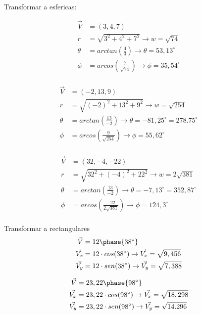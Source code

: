     Transformar a esfericas:

    \begin{align*}
        \vec{V}&=(3,4,7) \\
        r &= \sqrt{3^2+4^2+7^2} \rightarrow w =\sqrt{74}  \\
        \theta&= arctan\left(\frac{4}{3}\right)  \rightarrow \theta= 53,13^\circ \\
        \phi &=arcos\left(\frac{7}{\sqrt{74}}\right)  \rightarrow \phi= 35,54^\circ\\
    \end{align*}

    \begin{align*}
        \vec{V}&=(-2,13,9) \\
        r &= \sqrt{(-2)^2+13^2+9^2}  \rightarrow w =\sqrt{254}  \\
        \theta&= arctan\left(\frac{13}{-2}\right)  \rightarrow \theta= -81,25^\circ= 278.75^\circ\\
        \phi &= arcos\left(\frac{9}{\sqrt{254}}\right)  \rightarrow \phi=  55,62^\circ\\
    \end{align*}

    \begin{align*}
        \vec{V}&=(32,-4,-22) \\
        r &= \sqrt{32^2+(-4)^2+22^2}  \rightarrow w =2\sqrt{381}  \\
        \theta&= arctan\left(\frac{13}{-2}\right)  \rightarrow \theta= -7,13^\circ=352,87^\circ \\
        \phi &= arcos\left(\frac{-22}{2\sqrt{381}}\right)  \rightarrow \phi= 124,3^\circ\\
    \end{align*}

    Transformar a rectangulares
    \begin{align*}
        \vec{V}&=12\phase{38^\circ}  \\
        \vec{V_x}&= 12\cdot cos(38^\circ) \rightarrow \vec{V_x} = \sqrt{9,456} \\
        \vec{V_y}& =  12\cdot sen(38^\circ)  \rightarrow \vec{V_y}= \sqrt{7,388} \\
    \end{align*}

    \begin{align*}
        \vec{V}&=23,22 \phase{98^\circ}  \\
        \vec{V_x}&= 23,22\cdot cos(98^\circ)  \rightarrow \vec{V_x} = \sqrt{18,298} \\
        \vec{V_y}& =  23,22\cdot sen(98^\circ)  \rightarrow \vec{V_y}= \sqrt{14.296} \\
    \end{align*}

